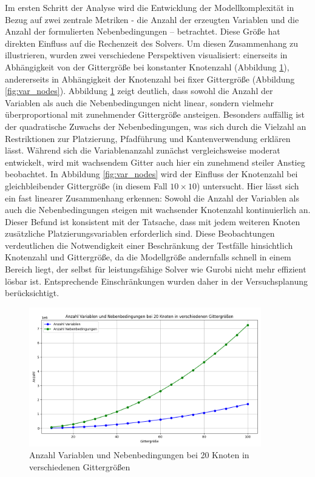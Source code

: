 \documentclass[bachelor, german]{algothesis}
\begin{document}
Im ersten Schritt der Analyse wird die Entwicklung der Modellkomplexität in Bezug auf zwei zentrale Metriken - die Anzahl der erzeugten Variablen und die Anzahl der formulierten Nebenbedingungen – betrachtet. Diese Größe hat direkten Einfluss auf die Rechenzeit des Solvers. Um diesen Zusammenhang zu illustrieren, wurden zwei verschiedene Perspektiven visualisiert: einerseits in Abhängigkeit von der Gittergröße bei konstanter Knotenzahl (Abbildung \ref{fig:var_grid}), andererseits in Abhängigkeit der Knotenzahl bei fixer Gittergröße (Abbildung \ref{fig:var_nodes}).\newline 
Abbildung \ref{fig:var_grid} zeigt deutlich, dass sowohl die Anzahl der Variablen als auch die Nebenbedingungen nicht linear, sondern vielmehr überproportional mit zunehmender Gittergröße ansteigen. Besonders auffällig ist der quadratische Zuwachs der Nebenbedingungen, was sich durch die Vielzahl an Restriktionen zur Platzierung, Pfadführung und Kantenverwendung erklären lässt. Während sich die Variablenanzahl zunächst vergleichsweise moderat entwickelt, wird mit wachsendem Gitter auch hier ein zunehmend steiler Anstieg beobachtet.\newline
In Abbildung \ref{fig:var_nodes} wird der Einfluss der Knotenzahl bei gleichbleibender Gittergröße (in diesem Fall $10 \times 10$) untersucht. Hier lässt sich ein fast linearer Zusammenhang erkennen: Sowohl die Anzahl der Variablen als auch die Nebenbedingungen steigen mit wachsender Knotenzahl kontinuierlich an. Dieser Befund ist konsistent mit der Tatsache, dass mit jedem weiteren Knoten zusätzliche Platzierungsvariablen erforderlich sind.\newline 
Diese Beobachtungen verdeutlichen die Notwendigkeit einer Beschränkung der Testfälle hinsichtlich Knotenzahl und Gittergröße, da die Modellgröße andernfalls schnell in einem Bereich liegt, der selbst für leistungsfähige Solver wie Gurobi nicht mehr effizient lösbar ist. Entsprechende Einschränkungen wurden daher in der Versuchsplanung berücksichtigt.
\begin{figure}[H]
    \centering
    \includegraphics[width=0.9\textwidth]{figures/20NodesVarNEb.png}
    \caption{Anzahl Variablen und Nebenbedingungen bei 20 Knoten in verschiedenen Gittergrößen}
    \label{fig:var_grid}
\end{figure}
\end{document}
